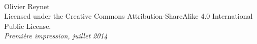 ~\vfill
\thispagestyle{empty}

\noindent {} Olivier Reynet\\ %



\noindent Licensed under the Creative Commons Attribution-ShareAlike 4.0 International Public License.\\ %

\noindent \textit{Première impression, juillet 2014} %